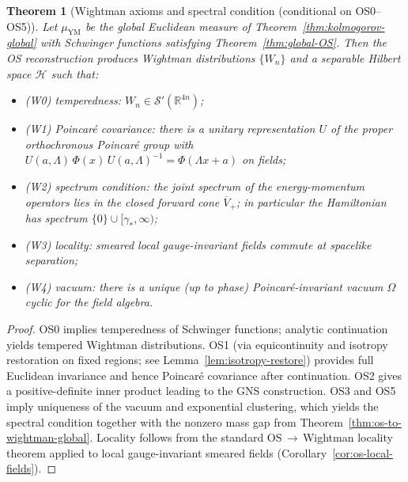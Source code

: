 \documentclass[11pt]{amsart}
\theoremstyle{plain}
\newtheorem{theorem}{Theorem}[section]
\theoremstyle{definition}
\theoremstyle{remark}
\begin{document}
\begin{theorem}[Wightman axioms and spectral condition (conditional on OS0--OS5)]\label{thm:wightman-axioms}
Let $\mu_{\mathrm{YM}}$ be the global Euclidean measure of Theorem~\ref{thm:kolmogorov-global} with Schwinger functions satisfying Theorem~\ref{thm:global-OS}. Then the OS reconstruction produces Wightman distributions $\{W_n\}$ and a separable Hilbert space $\mathcal H$ such that:
\begin{itemize}
  \item (W0) temperedness: $W_n\in \mathcal S'(\mathbb R^{4n})$;
  \item (W1) Poincar\'e covariance: there is a unitary representation $U$ of the proper orthochronous Poincar\'e group with $U(a,\Lambda)\,\Phi(x)\,U(a,\Lambda)^{-1}=\Phi(\Lambda x+a)$ on fields;
  \item (W2) spectrum condition: the joint spectrum of the energy-momentum operators lies in the closed forward cone $\overline{V}_+$; in particular the Hamiltonian has spectrum $\{0\}\cup[\gamma_*,\infty)$;
  \item (W3) locality: smeared local gauge-invariant fields commute at spacelike separation;
  \item (W4) vacuum: there is a unique (up to phase) Poincar\'e-invariant vacuum $\Omega$ cyclic for the field algebra.
\end{itemize}
\end{theorem}
\begin{proof}
OS0 implies temperedness of Schwinger functions; analytic continuation yields tempered Wightman distributions. OS1 (via equicontinuity and isotropy restoration on fixed regions; see Lemma~\ref{lem:isotropy-restore}) provides full Euclidean invariance and hence Poincar\'e covariance after continuation. OS2 gives a positive-definite inner product leading to the GNS construction. OS3 and OS5 imply uniqueness of the vacuum and exponential clustering, which yields the spectral condition together with the nonzero mass gap from Theorem~\ref{thm:os-to-wightman-global}. Locality follows from the standard OS\,$\to$\,Wightman locality theorem applied to local gauge-invariant smeared fields (Corollary~\ref{cor:os-local-fields}).
\end{proof}
\end{document}
